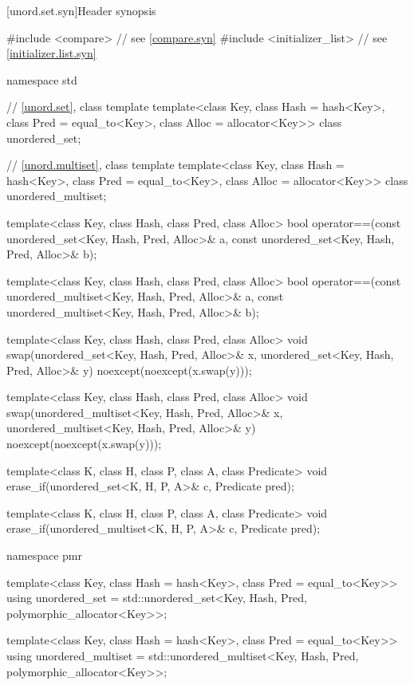 [unord.set.syn]{Header  synopsis}

%
%
%
\begin{codeblock}
#include <compare>              // see \ref{compare.syn}
#include <initializer_list>     // see \ref{initializer.list.syn}

namespace std {
  // \ref{unord.set}, class template 
  template<class Key,
           class Hash = hash<Key>,
           class Pred = equal_to<Key>,
           class Alloc = allocator<Key>>
    class unordered_set;

  // \ref{unord.multiset}, class template 
  template<class Key,
           class Hash = hash<Key>,
           class Pred = equal_to<Key>,
           class Alloc = allocator<Key>>
    class unordered_multiset;

  template<class Key, class Hash, class Pred, class Alloc>
    bool operator==(const unordered_set<Key, Hash, Pred, Alloc>& a,
                    const unordered_set<Key, Hash, Pred, Alloc>& b);

  template<class Key, class Hash, class Pred, class Alloc>
    bool operator==(const unordered_multiset<Key, Hash, Pred, Alloc>& a,
                    const unordered_multiset<Key, Hash, Pred, Alloc>& b);

  template<class Key, class Hash, class Pred, class Alloc>
    void swap(unordered_set<Key, Hash, Pred, Alloc>& x,
              unordered_set<Key, Hash, Pred, Alloc>& y)
      noexcept(noexcept(x.swap(y)));

  template<class Key, class Hash, class Pred, class Alloc>
    void swap(unordered_multiset<Key, Hash, Pred, Alloc>& x,
              unordered_multiset<Key, Hash, Pred, Alloc>& y)
      noexcept(noexcept(x.swap(y)));

  template<class K, class H, class P, class A, class Predicate>
    void erase_if(unordered_set<K, H, P, A>& c, Predicate pred);

  template<class K, class H, class P, class A, class Predicate>
    void erase_if(unordered_multiset<K, H, P, A>& c, Predicate pred);

  namespace pmr {
    template<class Key,
             class Hash = hash<Key>,
             class Pred = equal_to<Key>>
      using unordered_set = std::unordered_set<Key, Hash, Pred,
                                               polymorphic_allocator<Key>>;

    template<class Key,
             class Hash = hash<Key>,
             class Pred = equal_to<Key>>
      using unordered_multiset = std::unordered_multiset<Key, Hash, Pred,
                                                         polymorphic_allocator<Key>>;
  }
}
\end{codeblock}


